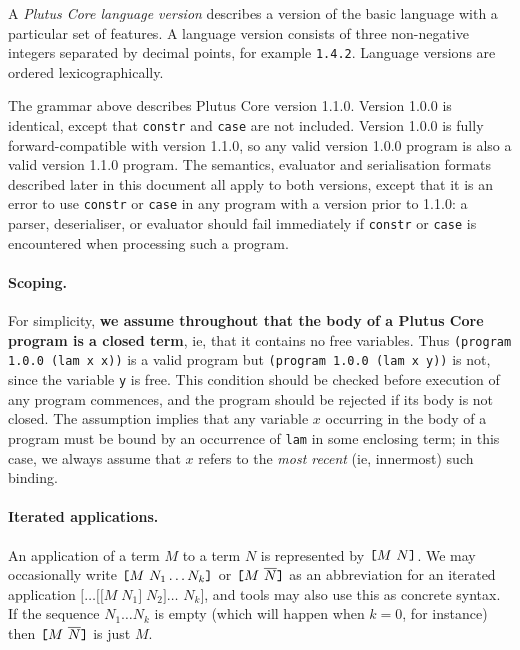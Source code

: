 A \textit{Plutus Core language version} describes a version of
the basic language with a particular set of features. A language version
consists of three non-negative integers separated by decimal points, for
example \texttt{1.4.2}. Language versions are ordered lexicographically.

The grammar above describes Plutus Core version 1.1.0. Version 1.0.0
is identical, except that \texttt{constr}
and \texttt{case} are not included.  Version 1.0.0 is fully forward-compatible
with version 1.1.0, so any valid version 1.0.0 program is also a valid version
1.1.0 program.  The semantics, evaluator and serialisation formats described
later in this document all apply to both versions, except that it is an error to
use \texttt{constr} or \texttt{case} in any program with a version prior to
1.1.0: a parser, deserialiser, or evaluator should fail immediately if
\texttt{constr} or \texttt{case} is encountered when processing such a program.

\paragraph{Scoping.} For simplicity, \textbf{we assume throughout that the body of a
Plutus Core program is a closed term}, ie, that it contains no free variables.
Thus \texttt{(program 1.0.0 (lam x x))} is a valid program but \texttt{(program
  1.0.0 (lam x y))} is not, since the variable \texttt{y} is free. This
condition should be checked before execution of any program commences, and the
program should be rejected if its body is not closed.  The assumption implies
that any variable $x$ occurring in the body of a program must be bound by an
occurrence of \texttt{lam} in some enclosing term; in this case, we always
assume that $x$ refers to the \textit{most recent} (ie, innermost) such binding.

\paragraph{Iterated applications.}
An application of a term $M$ to a term $N$ is represented by $\texttt{[} M ~ N \texttt{]}$. We
may occasionally write $\texttt{[} M ~ N_1 \ldots N_k \texttt{]}$ or $\texttt{[} M ~ \overline{N} \texttt{]}$
as an abbreviation for an iterated application
$\mathtt{[}\ldots\mathtt{[[}M\;N_1\mathtt{]}\;N_2\mathtt{]}\ldots $ %
$N_k\mathtt{]}$, and tools may also use this as
concrete syntax.  If the sequence ${N_1 \ldots N_k}$ is empty (which will happen
when $k=0$, for instance) then $\texttt{[} M ~ \overline{N} \texttt{]}$ is just $M$.

